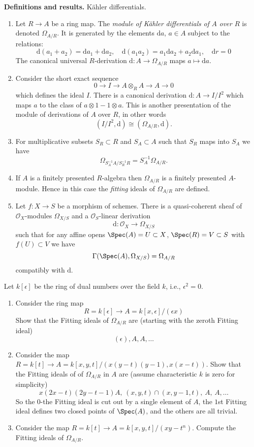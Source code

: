 \noindent
{\bf Definitions and results.} K\"ahler differentials.
\begin{enumerate}
\item Let $R \to A$ be a ring map. The {\it module of K\"ahler
differentials of $A$ over $R$} is denoted $\Omega_{A/R}$.
It is generated by the elements $\text{d}a$, $a \in A$
subject to the relations:
$$
\text{d}(a_1 + a_2) = \text{d}a_1 + \text{d}a_2,\quad
\text{d}(a_1a_2) = a_1\text{d}a_2 + a_2\text{d}a_1,\quad
\text{d}r = 0
$$
The canonical universal $R$-derivation $\text{d} : A \to \Omega_{A/R}$
maps $a\mapsto \text{d}a$.
\item Consider the short exact sequence
$$
0 \to I \to A \otimes_R A \to A \to 0
$$
which defines the ideal $I$. There is a canonical derivation
$\text{d} : A \to I/I^2$ which maps $a$ to the class of
$a \otimes 1 - 1 \otimes a$. This is another presentation of
the module of derivations of $A$ over $R$, in other words
$$
(I/I^2, \text{d}) \cong (\Omega_{A/R}, \text{d}).
$$
\item For multiplicative subsets $S_R \subset R$ and
$S_A \subset A$ such that $S_R$ maps into $S_A$ we have
$$
\Omega_{S_A^{-1}A / S_R^{-1}R} =
S_A^{-1}\Omega_{A/R}.
$$
\item If $A$ is a finitely presented $R$-algebra then
$\Omega_{A/R}$ is a finitely presented $A$-module. Hence in
this case the {\it fitting} ideals of $\Omega_{A/R}$ are defined.
\item Let $f : X \to S$ be a morphism of schemes. There is
a quasi-coherent sheaf of ${\mathcal O}_X$-modules $\Omega_{X/S}$
and a ${\mathcal O}_S$-linear derivation
$$
\text{d} : {\mathcal O}_X \longrightarrow \Omega_{X/S}
$$
such that for any affine opens $\Spec(A) = U \subset X$,
$\Spec(R) = V \subset S$
with $f(U) \subset V$ we have
$$
\Gamma(\Spec(A), \Omega_{X/S}) = \Omega_{A/R}
$$
compatibly with $\text{d}$.
\end{enumerate}

\begin{exercise}
\label{exercise-dual-numbers}
Let $k[\epsilon]$ be the ring of dual numbers
over the field $k$, i.e., $\epsilon^2 = 0$.
\begin{enumerate}
\item Consider the ring map
$$
R = k[\epsilon] \to A = k[x, \epsilon]/(\epsilon x)
$$
Show that the Fitting ideals of $\Omega_{A/R}$ are (starting with the
zeroth Fitting ideal)
$$
(\epsilon), A, A, \ldots
$$
\item Consider the map $R = k[t] \to
A = k[x, y, t]/(x(y-t)(y-1), x(x-t))$. Show that the Fitting ideals of
of $\Omega_{A/R}$ in $A$ are (assume characteristic $k$ is zero
for simplicity)
$$
x(2x-t)(2y-t-1)A, \ (x, y, t)\cap (x, y-1, t), \ A, \ A, \ldots
$$
So the $0$-the Fitting ideal is cut out by a single element of $A$,
the $1$st Fitting ideal defines two closed points of $\Spec(A)$, and
the others are all trivial.
\item Consider the map $R = k[t] \to A = k[x, y, t]/(xy-t^n)$.
Compute the Fitting ideals of $\Omega_{A/R}$.
\end{enumerate}
\end{exercise}

